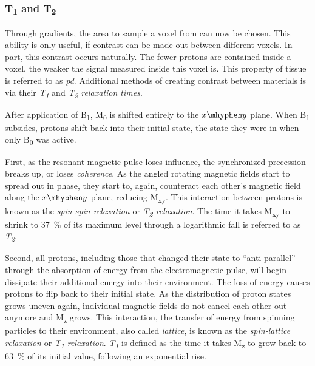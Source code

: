 \subsubsection{T\textsubscript{1} and T\textsubscript{2}}

Through gradients, the area to sample a voxel from can now be chosen. This 
ability is only useful, if contrast can be made out
between different voxels. In part, this contrast occurs naturally. The fewer 
protons are contained inside a voxel, the weaker the signal measured inside this
voxel is. This property of tissue is referred to as \textit{\ac{pd}}.
Additional methods of creating contrast between materials is via their
\textit{T\textsubscript{1}} and \textit{T\textsubscript{2} relaxation times}.

After application of B\textsubscript{1}, M\textsubscript{0} is shifted entirely to the $x\mhyphen y$
plane. When B\textsubscript{1} subsides, protons shift back into their initial state, the 
state they were in when only B\textsubscript{0} was active. 

First, as the resonant magnetic pulse loses influence, the synchronized 
precession breaks up, or loses \textit{coherence}. As the angled rotating magnetic 
fields start to spread out in phase, they start to, again, counteract each other's
magnetic field along the $x\mhyphen y$ plane, reducing M\textsubscript{xy}. This interaction
between protons is known as the \textit{spin-spin relaxation} or 
\textit{T\textsubscript{2} relaxation}. The time it takes M\textsubscript{xy} to shrink to \SI{37}{\percent} of its 
maximum level through a logarithmic fall is referred to as \textit{T\textsubscript{2}}\cite{mri_handbook}.

Second, all protons, including those that changed their state to 
\enquote{anti-parallel} through the absorption of energy from the 
electromagnetic pulse, will begin dissipate their additional energy into their 
environment. The loss of energy causes protons to flip back to their initial 
state. As the distribution of proton states grows uneven again, individual 
magnetic fields do not cancel each other out anymore and M\textsubscript{z} grows. This 
interaction, the transfer of energy from spinning particles to their 
environment, also called \textit{lattice}, is known as the 
\textit{spin-lattice relaxation} or \textit{T\textsubscript{1} relaxation}. \textit{T\textsubscript{1}} is 
defined as the time it takes M\textsubscript{z} to grow back to \SI{63}{\percent} of its initial value, 
following an exponential rise\cite{mri_handbook}.

